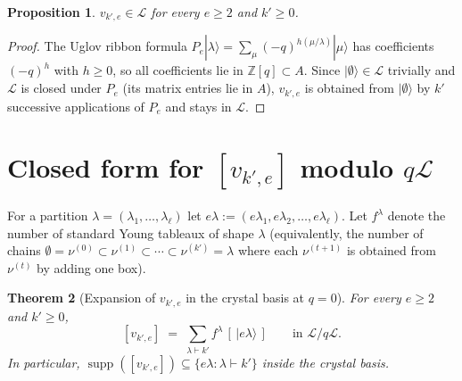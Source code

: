 \documentclass[11pt]{article}
\newtheorem{theorem}{Theorem}
\newtheorem{proposition}[theorem]{Proposition}
\theoremstyle{definition}
\newcommand{\vke}{v_{k',e}}
\newcommand{\ZZ}{\mathbb{Z}}
\newcommand{\supp}{\operatorname{supp}}
\newcommand{\Lcr}{\mathcal{L}}
\begin{document}
\begin{proposition}\label{prop:in-L}
$\vke \in \Lcr$ for every $e \ge 2$ and $k' \ge 0$.
\end{proposition}

\begin{proof}
The Uglov ribbon formula
$P_e |\lambda\rangle = \sum_\mu (-q)^{h(\mu/\lambda)} |\mu\rangle$
has coefficients $(-q)^h$ with $h \ge 0$, so all coefficients lie in
$\ZZ[q] \subset A$. Since $|\emptyset\rangle \in \Lcr$ trivially and
$\Lcr$ is closed under $P_e$ (its matrix entries lie in $A$), $\vke$ is
obtained from $|\emptyset\rangle$ by $k'$ successive applications of $P_e$
and stays in $\Lcr$.
\end{proof}

\section{Closed form for $[\vke]$ modulo $q\Lcr$}\label{sec:expansion}

For a partition $\lambda = (\lambda_1, \dots, \lambda_\ell)$ let
$e\lambda := (e\lambda_1, e\lambda_2, \dots, e\lambda_\ell)$. Let
$f^\lambda$ denote the number of standard Young tableaux of shape $\lambda$
(equivalently, the number of chains
$\emptyset = \nu^{(0)} \subset \nu^{(1)} \subset \cdots \subset \nu^{(k')} = \lambda$
where each $\nu^{(t+1)}$ is obtained from $\nu^{(t)}$ by adding one box).

\begin{theorem}[Expansion of $\vke$ in the crystal basis at $q=0$]\label{thm:expansion}
For every $e \ge 2$ and $k' \ge 0$,
\[
  [\vke] \;=\; \sum_{\lambda \vdash k'} f^\lambda \,[\,|e\lambda\rangle\,]
  \qquad \text{in } \Lcr/q\Lcr.
\]
In particular, $\supp([\vke]) \subseteq \{e\lambda : \lambda \vdash k'\}$
inside the crystal basis.
\end{theorem}
\end{document}

